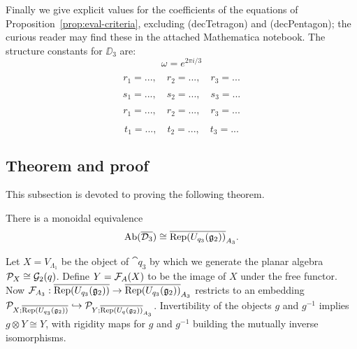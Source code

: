 Finally we give explicit values for the coefficients of the equations of Proposition~\ref{prop:eval-criteria}, excluding (decTetragon) and (decPentagon); the curious reader may find these in the attached Mathematica notebook. The structure constants for $\DD_3$ are:
\begin{equation*}
    \omega = e^{2\pi i/3}
\end{equation*}

\begin{equation*}
    r_1 = ..., \quad r_2 = ..., \quad r_3 = ...
\end{equation*}

\begin{equation*}
    s_1 = ..., \quad s_2 = ..., \quad s_3 = ...
\end{equation*}

\begin{equation*}
    r_1 = ..., \quad r_2 = ..., \quad r_3 = ...
\end{equation*}

\begin{equation*}
    t_1 = ..., \quad t_2 = ..., \quad t_3 = ...
\end{equation*}




\subsection{Theorem and proof}
This subsection is devoted to proving the following theorem.

\begin{theorem}\label{thm:level-3}
    There is a monoidal equivalence
    \[
        \operatorname{Ab}(\overline{\mathcal{D}_3}) \cong \overline{ \operatorname{Rep}(U_{q_3}(\mathfrak{g}_2))}_{A_3}.
    \]
\end{theorem}

Let $X = V_{\Lambda_1}$ be the object of $\cat{q_3}$ by which we generate the planar algebra $\mathcal{P}_X \cong \mathcal{G}_2(q)$. Define $Y=\mathcal{F}_A(X)$ to be the image of $X$ under the free functor. Now $\mathcal{F}_{A_3}:\overline{\operatorname{Rep}(U_{q_3}(\mathfrak{g}_2))} \to \overline{\operatorname{Rep}(U_{q_3}(\mathfrak{g}_2))}_{A_3}$ restricts to an embedding $\mathcal{P}_{X;\overline{\operatorname{Rep}(U_{q_3}(\mathfrak{g}_2))}} \hookrightarrow \mathcal{P}_{Y;\overline{\operatorname{Rep}(U_{q}(\mathfrak{g}_2))}_{A_3}}$. Invertibility of the objects $g$ and $g^{-1}$ implies $g\otimes Y \cong Y$, with rigidity maps for $g$ and $g^{-1}$ building the mutually inverse isomorphisms.

